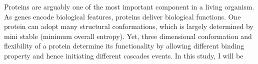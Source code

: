 Proteins are arguably one of the most important component in a living organism. As genes encode biological features, proteins deliver biological functions. One protein can adopt many structural conformations, which is largely determined by mini stable (minimum overall entropy). Yet, three dimensional conformation and flexibility of a protein determine its functionality by allowing different binding property and hence initiating different cascades events. In this study, I will be 